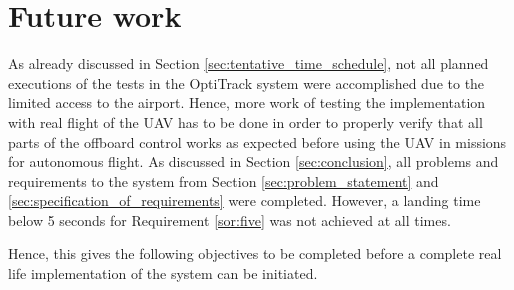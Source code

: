 \documentclass[../Head/report.tex]{subfiles}
\begin{document}
\section{Future work}
\label{sec:future_work}

As already discussed in Section \ref{sec:tentative_time_schedule}, not all planned executions of the tests in the OptiTrack system were accomplished due to the limited access to the airport. Hence, more work of testing the implementation with real flight of the UAV has to be done in order to properly verify that all parts of the offboard control works as expected before using the UAV in missions for autonomous flight. As discussed in Section \ref{sec:conclusion}, all problems and requirements to the system from Section \ref{sec:problem_statement} and \ref{sec:specification_of_requirements} were completed. However, a landing time below 5 seconds for Requirement \ref{sor:five} was not achieved at all times. 

Hence, this gives the following objectives to be completed before a complete real life implementation of the system can be initiated. 
\end{document}
